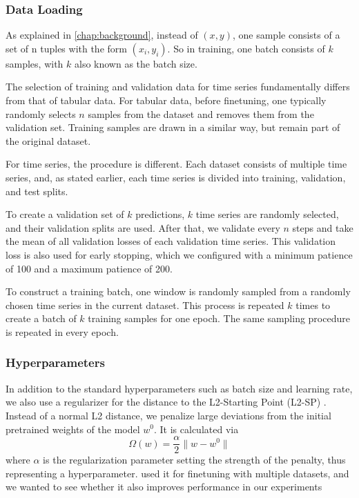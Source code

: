 \subsubsection{Data Loading}

As explained in \autoref{chap:background}, instead of $(x, y)$, one sample consists of a set of n tuples with the form $(x_i, y_i)$.
So in training, one batch consists of $k$ samples, with $k$ also known as the batch size.

The selection of training and validation data for time series fundamentally differs from that of tabular data.
For tabular data, before finetuning, one typically randomly selects $n$ samples from the dataset and removes them from the validation set.
Training samples are drawn in a similar way, but remain part of the original dataset.

For time series, the procedure is different.
Each dataset consists of multiple time series, and, as stated earlier, each time series is divided into training, validation, and test splits.

To create a validation set of $k$ predictions, $k$ time series are randomly selected, and their validation splits are used.
After that, we validate every $n$ steps and take the mean of all validation losses of each validation time series.
This validation loss is also used for early stopping, which we configured with a minimum patience of 100 and a maximum patience of 200.

To construct a training batch, one window is randomly sampled from a randomly chosen time series in the current dataset.
This process is repeated $k$ times to create a batch of $k$ training samples for one epoch.
The same sampling procedure is repeated in every epoch.

\subsubsection{Hyperparameters}
In addition to the standard hyperparameters such as batch size and learning rate, we also use a regularizer for the distance to the L2-Starting Point (L2-SP) \citep{xuhong2018explicit}.
Instead of a normal L2 distance, we penalize large deviations from the initial pretrained weights of the model $w^0$.
It is calculated via
\[
    \Omega(w)= \frac{\alpha}{2} \lVert w - w^0 \rVert
\]
where $\alpha$ is the regularization parameter setting the strength of the penalty, thus representing a hyperparameter.
\citet{Hollmann_2025} used it for finetuning with multiple datasets, and we wanted to see whether it also improves performance in our experiments

